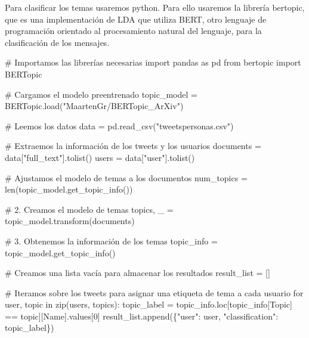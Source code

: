 \documentclass[
  letterpaper,
  DIV=11,
  numbers=noendperiod]{scrartcl}
\newenvironment{Shaded}{\begin{snugshade}}{\end{snugshade}}
\newcommand{\BuiltInTok}[1]{\textcolor[rgb]{0.00,0.23,0.31}{#1}}
\newcommand{\CommentTok}[1]{\textcolor[rgb]{0.37,0.37,0.37}{#1}}
\newcommand{\ControlFlowTok}[1]{\textcolor[rgb]{0.00,0.23,0.31}{#1}}
\newcommand{\DecValTok}[1]{\textcolor[rgb]{0.68,0.00,0.00}{#1}}
\newcommand{\ImportTok}[1]{\textcolor[rgb]{0.00,0.46,0.62}{#1}}
\newcommand{\KeywordTok}[1]{\textcolor[rgb]{0.00,0.23,0.31}{#1}}
\newcommand{\NormalTok}[1]{\textcolor[rgb]{0.00,0.23,0.31}{#1}}
\newcommand{\OperatorTok}[1]{\textcolor[rgb]{0.37,0.37,0.37}{#1}}
\newcommand{\StringTok}[1]{\textcolor[rgb]{0.13,0.47,0.30}{#1}}
\begin{document}
Para clasificar los temas usaremos python. Para ello usaremos la
librería bertopic, que es una implementación de LDA que utiliza BERT,
otro lenguaje de programación orientado al procesamiento natural del
lenguaje, para la clasificación de los mensajes.

\begin{Shaded}
\begin{Highlighting}[]
\CommentTok{\# Importamos las librerías necesarias}
\ImportTok{import}\NormalTok{ pandas }\ImportTok{as}\NormalTok{ pd}
\ImportTok{from}\NormalTok{ bertopic }\ImportTok{import}\NormalTok{ BERTopic}

\CommentTok{\# Cargamos el modelo preentrenado}
\NormalTok{topic\_model }\OperatorTok{=}\NormalTok{ BERTopic.load(}\StringTok{"MaartenGr/BERTopic\_ArXiv"}\NormalTok{)}

\CommentTok{\# Leemos los datos}
\NormalTok{data }\OperatorTok{=}\NormalTok{ pd.read\_csv(}\StringTok{"tweetspersonas.csv"}\NormalTok{)}

\CommentTok{\# Extraemos la información de los tweets y los usuarios}
\NormalTok{documents }\OperatorTok{=}\NormalTok{ data[}\StringTok{"full\_text"}\NormalTok{].tolist()}
\NormalTok{users }\OperatorTok{=}\NormalTok{ data[}\StringTok{"user"}\NormalTok{].tolist()}

\CommentTok{\# Ajustamos el modelo de temas a los documentos}
\NormalTok{num\_topics }\OperatorTok{=} \BuiltInTok{len}\NormalTok{(topic\_model.get\_topic\_info())}

\CommentTok{\# 2. Creamos el modelo de temas}
\NormalTok{topics, \_ }\OperatorTok{=}\NormalTok{ topic\_model.transform(documents)}

\CommentTok{\# 3. Obtenemos la información de los temas}
\NormalTok{topic\_info }\OperatorTok{=}\NormalTok{ topic\_model.get\_topic\_info()}

\CommentTok{\# Creamos una lista vacía para almacenar los resultados}
\NormalTok{result\_list }\OperatorTok{=}\NormalTok{ []}

\CommentTok{\# Iteramos sobre los tweets para asignar una etiqueta de tema a cada usuario}
\ControlFlowTok{for}\NormalTok{ user, topic }\KeywordTok{in} \BuiltInTok{zip}\NormalTok{(users, topics):}
\NormalTok{    topic\_label }\OperatorTok{=}\NormalTok{ topic\_info.loc[topic\_info[}\StringTok{\textquotesingle{}Topic\textquotesingle{}}\NormalTok{] }\OperatorTok{==}\NormalTok{ topic][}\StringTok{\textquotesingle{}Name\textquotesingle{}}\NormalTok{].values[}\DecValTok{0}\NormalTok{]}
\NormalTok{    result\_list.append(\{}\StringTok{"user"}\NormalTok{: user, }\StringTok{"classification"}\NormalTok{: topic\_label\})}


\end{Highlighting}
\end{Shaded}
\end{document}

